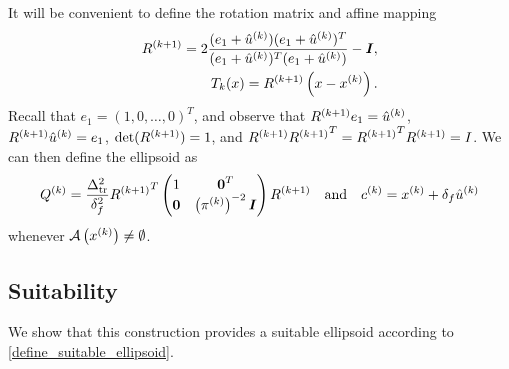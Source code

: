 \documentclass{article}
\begin{document}
It will be convenient to define the rotation matrix and affine mapping
\begin{align}
{R^{(k+1)}} = 2\frac{(e_1 + {{{\hat u}^{(k)}}})(e_1 +{{{\hat u}^{(k)}}})^T}{(e_1 +{{{\hat u}^{(k)}}})^T(e_1 +{{{\hat u}^{(k)}}})} - \boldsymbol I, \label{define_r} \\
T_k(x) = {R^{(k+1)}}\left(x - x^{(k)}\right). \label{define_affine_mapping}
\end{align}
Recall that $e_1 = (1, 0, \ldots, 0)^T$, and observe that ${R^{(k+1)}} e_1 = {{{\hat u}^{(k)}}}$, ${R^{(k+1)}} {{{\hat u}^{(k)}}} = e_1$, $\det({R^{(k+1)}}) = 1$, and 
${R^{(k+1)}} {R^{(k+1)}} ^T = {R^{(k+1)}} ^T{R^{(k+1)}} = I$.
We can then define the ellipsoid as
\begin{align}
\label{define_linear_nontrival_ellipsoid}
{Q^{(k)}} = \frac {\Delta_{\textrm{tr}}^2} {\delta_f^2} {R^{(k+1)}}^T \begin{pmatrix}
1 & \boldsymbol0^T \\
\boldsymbol 0 & \left({\pi^{(k)}}\right)^{-2} \boldsymbol I \\
\end{pmatrix} {R^{(k+1)}}
\quad
\textrm{and}
\quad
c^{(k)} = x^{(k)}+\delta_{f} {{{\hat u}^{(k)}}}
\end{align}
whenever ${\mathcal A}\left(x^{(k)}\right) \ne \emptyset$.






\subsection{Suitability}

We show that this construction provides a suitable ellipsoid according to \cref{define_suitable_ellipsoid}.

\end{document}
